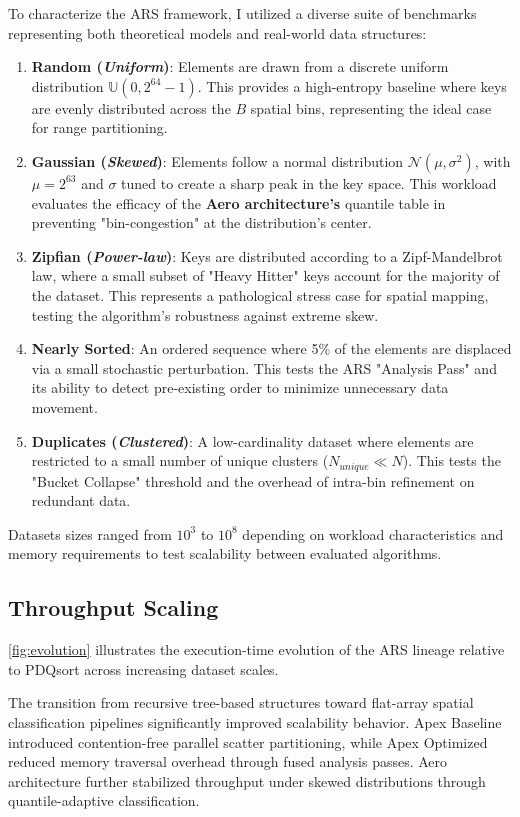 To characterize the ARS framework, I utilized a diverse suite of benchmarks representing both theoretical models and real-world data structures:
 \begin{enumerate}
 \item \textbf{Random (\textit{Uniform})}: Elements are drawn from a discrete uniform distribution $\mathbb{U}(0, 2^{64}-1)$. This provides a high-entropy baseline where keys are evenly distributed across the $B$ spatial bins, representing the ideal case for range partitioning.
 \item \textbf{Gaussian (\textit{Skewed})}: Elements follow a normal distribution $\mathcal{N}(\mu, \sigma^2)$, with $\mu = 2^{63}$ and $\sigma$ tuned to create a sharp peak in the key space. This workload evaluates the efficacy of the \textbf{Aero architecture's} quantile table in preventing "bin-congestion" at the distribution's center.
 \item \textbf{Zipfian (\textit{Power-law})}: Keys are distributed according to a Zipf-Mandelbrot law, where a small subset of "Heavy Hitter" keys account for the majority of the dataset. This represents a pathological stress case for spatial mapping, testing the algorithm's robustness against extreme skew.
 \item \textbf{Nearly Sorted}: An ordered sequence where 5\% of the elements are displaced via a small stochastic perturbation. This tests the ARS "Analysis Pass" and its ability to detect pre-existing order to minimize unnecessary data movement.
 \item \textbf{Duplicates (\textit{Clustered})}: A low-cardinality dataset where elements are restricted to a small number of unique clusters ($N_{unique} \ll N$). This tests the "Bucket Collapse" threshold and the overhead of intra-bin refinement on redundant data.
\end{enumerate}
Datasets sizes ranged from $10^3$ to $10^8$ depending on workload characteristics and memory requirements to test scalability between evaluated algorithms.

\subsection{Throughput Scaling}
\cref{fig:evolution} illustrates the execution-time evolution of the ARS lineage relative to PDQsort across increasing dataset scales.

The transition from recursive tree-based structures toward flat-array spatial classification pipelines significantly improved scalability behavior.
Apex Baseline introduced contention-free parallel scatter partitioning, while Apex Optimized reduced memory traversal overhead through fused analysis passes.
Aero architecture further stabilized throughput under skewed distributions through quantile-adaptive classification.

